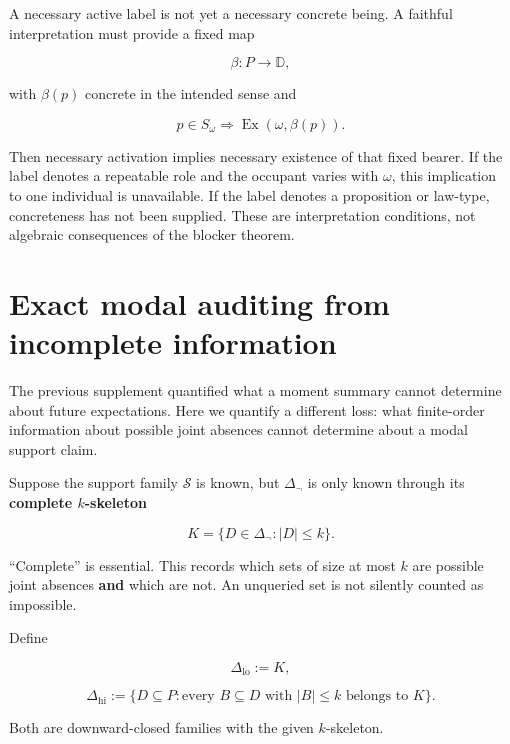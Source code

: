 \documentclass[11pt,a4paper]{article}
\begin{document}
A necessary active label is not yet a necessary concrete being. A
faithful interpretation must provide a fixed map

\nopagebreak[4]

\[
\beta:P\longrightarrow\mathbb D,
\]

with \(\beta(p)\) concrete in the intended sense and

\nopagebreak[4]

\[
p\in S_\omega\Longrightarrow\operatorname{Ex}(\omega,\beta(p)).
\]

Then necessary activation implies necessary existence of that fixed
bearer. If the label denotes a repeatable role and the occupant varies
with \(\omega\), this implication to one individual is unavailable. If
the label denotes a proposition or law-type, concreteness has not been
supplied. These are interpretation conditions, not algebraic
consequences of the blocker theorem.

\section{Exact modal auditing from incomplete
information}\label{exact-modal-auditing-from-incomplete-information}

The previous supplement quantified what a moment summary cannot
determine about future expectations. Here we quantify a different loss:
what finite-order information about possible joint absences cannot
determine about a modal support claim.

Suppose the support family \(\mathscr S\) is known, but
\(\Delta_{\neg}\) is only known through its \textbf{complete
\(k\)-skeleton}

\nopagebreak[4]

\[
K=\{D\in\Delta_{\neg}:|D|\le k\}.
\]

``Complete'' is essential. This records which sets of size at most \(k\)
are possible joint absences \textbf{and} which are not. An unqueried set
is not silently counted as impossible.

Define

\nopagebreak[4]

\[
\Delta_{\mathrm{lo}}:=K,
\]

\nopagebreak[4]

\[
\Delta_{\mathrm{hi}}
 :=\{D\subseteq P:\text{every }B\subseteq D\text{ with }|B|\le k
                                    \text{ belongs to }K\}.
\]

Both are downward-closed families with the given \(k\)-skeleton.
\end{document}
